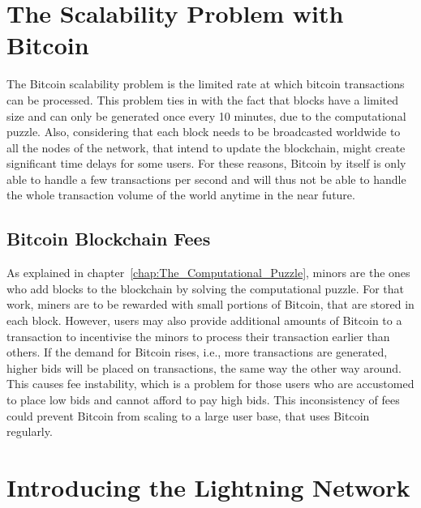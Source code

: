 \documentclass[a4paper, 12pt]{report}
\begin{document}
\chapter{The Scalability Problem with Bitcoin}

\par The Bitcoin scalability problem is the limited rate at which bitcoin transactions can be processed. This problem ties in with the fact that blocks have a limited size and can only be generated once every 10 minutes, due to the computational puzzle. Also, considering that each block needs to be broadcasted worldwide to all the nodes of the network, that intend to update the blockchain, might create significant time delays for some users. For these reasons, Bitcoin by itself is only able to handle a few transactions per second and will thus not be able to handle the whole transaction volume of the world anytime in the near future.\cite{joseph}

\section{Bitcoin Blockchain Fees}

\par As explained in chapter~\ref{chap:The_Computational_Puzzle}, minors are the ones who add blocks to the blockchain by solving the computational puzzle. For that work, miners are to be rewarded with small portions of Bitcoin, that are stored in each block. However, users may also provide additional amounts of Bitcoin to a transaction to incentivise the minors to process their transaction earlier than others. If the demand for Bitcoin rises, i.e., more transactions are generated, higher bids will be placed on transactions, the same way the other way around. This causes fee instability, which is a problem for those users who are accustomed to place low bids and cannot afford to pay high bids. This inconsistency of fees could prevent Bitcoin from scaling to a large user base, that uses Bitcoin regularly.\cite{daniel}

\chapter{Introducing the Lightning Network}
\end{document}
